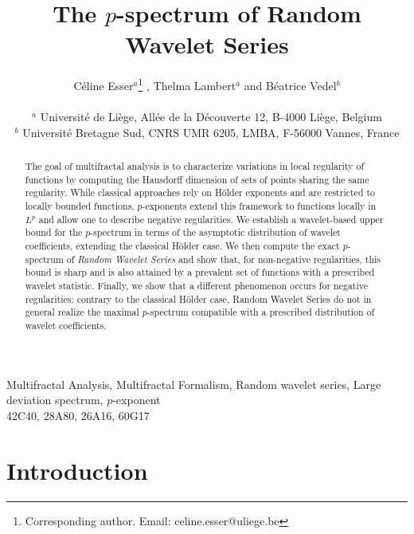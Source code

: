 \documentclass[a4paper,11pt,oneside]{article}
\title{The $p$-spectrum of Random Wavelet Series}
\author{C\'eline Esser$^a$\footnote{Corresponding author. Email:
    celine.esser@uliege.be} , Thelma Lambert$^a$ and B\'eatrice Vedel$^b$\\\\
$^a$ Universit\'e de Li\`ege,  All\'ee de la D\'ecouverte 12, B-4000
Li\`ege, Belgium \\
$^b$ Universit\'e Bretagne Sud, CNRS UMR 6205, LMBA, F-56000 Vannes, France}
\date{}
\theoremstyle{definition}
\theoremstyle{plain}
\begin{document}
\maketitle


\begin{abstract}
The goal of multifractal analysis is to characterize variations in local regularity of functions by computing the Hausdorff dimension of sets of points sharing the same regularity. While classical approaches rely on H\"older exponents and are restricted to locally bounded functions, $p$-exponents extend this framework to functions locally in $L^p$ and allow one to describe negative regularities. 
We establish a wavelet-based upper bound for the $p$-spectrum in terms of the asymptotic distribution of wavelet coefficients, extending the classical H\"older case. We then compute the exact $p$-spectrum of \textit{Random Wavelet Series} and show that, for non-negative regularities, this bound is sharp and is also attained by a prevalent set of functions with a prescribed wavelet statistic. Finally, we show that a different phenomenon occurs for negative regularities: contrary to the classical H\"older case, Random Wavelet Series do not in general realize the maximal $p$-spectrum compatible with a prescribed distribution of wavelet coefficients.
\end{abstract}

 Multifractal Analysis, Multifractal Formalism, Random wavelet series,  Large deviation spectrum, $p$-exponent\\

 42C40, 28A80, 26A16, 60G17\\

\section{Introduction}
\end{document}
